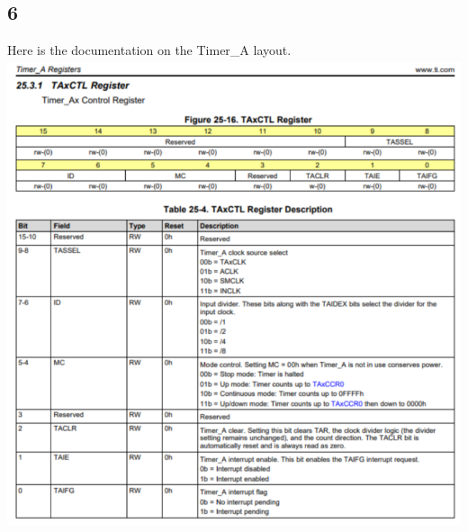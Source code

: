 \documentclass{article}
\begin{document}
\subsection{6}
Here is the documentation on the Timer\_A layout.
\newline
\includegraphics[width=1\textwidth]{pictures/image.png}
\end{document}
